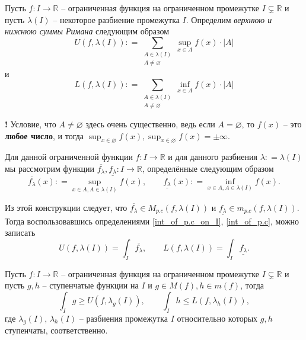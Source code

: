 \begin{definition}\label{up_and_low_Riman}
    Пусть $f:I \to \mathbb{R}$ -- ограниченная функция на ограниченном промежутке $I \subsetneq \mathbb{R}$ и пусть $\lambda(I)$ -- некоторое разбиение промежутка $I$. Определим \textit{верхнюю и нижнюю суммы Римана} следующим образом
    \[
 {U}(f, \lambda(I)): = \sum_{\substack{A \in \lambda(I) \\ A \ne  \varnothing}} \sup_{x\in A} f(x)\cdot |A|
     \]
     и
     \[
      {L}(f, \lambda(I)): = \sum_{\substack{A \in \lambda(I) \\ A \ne  \varnothing}} \inf_{x\in A} f(x)\cdot |A|
     \]
\end{definition}

\begin{mydanger}{\bf !}
    Условие, что $A \ne \varnothing$ здесь очень существенно, ведь если $A = \varnothing$, то $f(x)$ -- это \textbf{любое число}, и тогда $\sup_{x\in \varnothing} f(x), \sup_{x\in \varnothing} f(x)= \pm \infty.$
\end{mydanger}

\begin{remark}\label{U=int}
    Для данной ограниченной функции $f:I \to \mathbb{R}$ и для данного разбиения $\lambda: = \lambda(I)$ мы рассмотрим функции $\overline{f_\lambda}, \underline{f_\lambda}: I\to \mathbb{R}$, определённые следующим образом
    \[
     \overline{f_\lambda}(x): = \sup_{x\in A, A \in \lambda(I)} f(x),\qquad \underline{f_\lambda}(x): = \inf_{x\in A, A \in \lambda(I)} f(x).
    \]

Из этой конструкции следует, что $\overline{f_\lambda} \in M_{p.c}(f,\lambda(I))$ и $\underline{f_\lambda} \in m_{p.c}(f,\lambda(I)).$ Тогда воспользовавшись определениями \ref{int_of_p.c_on_I}, \ref{int_of_p.c}, можно записать
    \[
     U(f,\lambda(I)) = \int_I \overline{f_\lambda}, \qquad L(f,\lambda(I)) = \int_I \underline{f_\lambda}.
    \]
\end{remark}



\begin{lemma}\label{intg>U}
Пусть $f: I \to \mathbb{R}$ -- ограниченная функция на ограниченном промежутке $I \subsetneq \mathbb{R}$ и пусть $g,h$ -- ступенчатые функции на $I$ и $g \in M(f), h \in m(f)$, тогда
\[
 \int_I g \ge U(f, \lambda_g(I)), \qquad \int_I h \le L(f, \lambda_h(I)),
\]
где $\lambda_g(I)$, $\lambda_h(I)$ -- разбиения промежутка $I$ относительно которых $g,h$ ступенчаты, соответственно.
\end{lemma}

